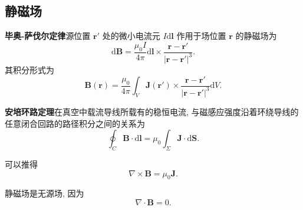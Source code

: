 \subsection{静磁场}
\textbf{毕奥-萨伐尔定律}\quad 源位置 $\bm{r}'$ 处的微小电流元 $I\mathrm{d}\bm{l}$ 作用于场位置 $\bm{r}$ 的静磁场为
\begin{equation}
    \mathrm{d}\bm{B}=\frac{\mu_0 I}{4\pi}\mathrm{d}\bm{l}\times\frac{\bm{r}-\bm{r}'}{|\bm{r}-\bm{r}'|^3}.
\end{equation}
其积分形式为
\begin{equation}
    \bm{B}(\bm{r})=\frac{\mu_0}{4\pi}\int_V\bm{J}(\bm{r}')\times\frac{\bm{r}-\bm{r}'}{|\bm{r}-\bm{r}'|^3}\mathrm{d}V.
\end{equation}

\textbf{安培环路定理}\quad 在真空中载流导线所载有的稳恒电流, 与磁感应强度沿着环绕导线的任意闭合回路的路径积分之间的关系为
\begin{equation} \label{eq:2.3 ampere's circuital law}
    \oint_C\bm{B}\cdot\mathrm{d}\bm{l}=\mu_0\int_\Sigma\bm{J}\cdot\mathrm{d}\bm{S}.
\end{equation}

可以推得
\begin{equation}
    \nabla\times\bm{B}=\mu_0\bm{J}.
\end{equation}

静磁场是无源场, 因为
\begin{equation}
    \nabla\cdot\bm{B}=0.
\end{equation}
